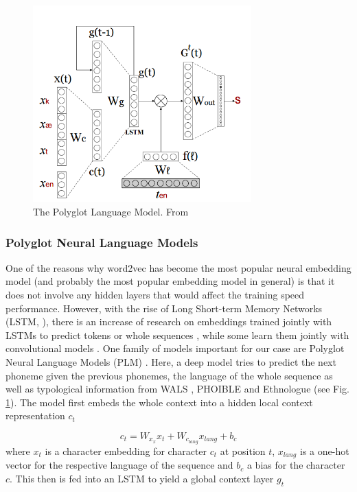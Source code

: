 \documentclass[11pt]{article}
\begin{document}
\begin{figure}[htbp] %
   \centering
   \includegraphics[width=0.75\textwidth]{polyglotLM} 
   \caption{The Polyglot Language Model. From \cite{tsvetkov2016polyglot}}
   \label{fig:plm}
\end{figure}


\subsubsection{Polyglot Neural Language Models}

One of the reasons why word2vec has become the most popular neural embedding model (and probably the most popular embedding model in general) is that it does not involve any hidden layers that would affect the training speed performance. However, with the rise of Long Short-term Memory Networks (LSTM, \cite{hochreiter1997long}), there is an increase of research on embeddings trained jointly with LSTMs to predict tokens or whole sequences \cite{chen2015joint,ling2015finding,kim2015character,dos2014learning}, while some learn them jointly with convolutional models \cite{zhang2015character}. One family of models important for our case are Polyglot Neural Language Models (PLM) \cite{tsvetkov2016polyglot}. Here, a deep model tries to predict the next phoneme given the previous phonemes, the language of the whole sequence as well as typological information from WALS \cite{wals}, PHOIBLE \cite{phoible} and Ethnologue \cite{lewis2015ethnologue} (see Fig. \ref{fig:plm}). 
The model first embeds the whole context into a hidden local context representation $c_t$

\begin{equation}
c_t = W_{x_{x}}x_t + W_{c_{lang}}x_{lang}+b_c
\label{eq:plm_1}
\end{equation}
where $x_t$ is a character embedding for character $c_t$ at position $t$, $x_{lang}$ is a one-hot vector for the respective language of the sequence and $b_c$ a bias for the character $c$. This then is fed into an LSTM to yield a global context layer $g_t$
\end{document}
